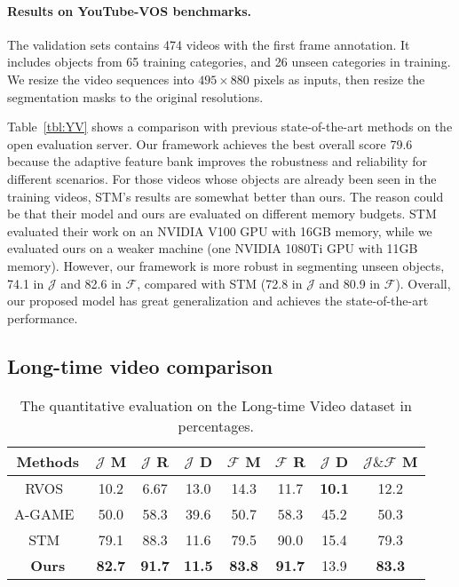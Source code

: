 \documentclass{article}
\begin{document}
\paragraph{Results on YouTube-VOS benchmarks.}
The validation sets contains 474 videos with the first frame annotation. 
It includes objects from 65 training categories, and 26 unseen categories in training. 
We resize the video sequences into $495 \times 880$ pixels as inputs, then resize the segmentation masks to the original resolutions.

Table~\ref{tbl:YV} shows a comparison with previous state-of-the-art methods on the open evaluation server.
Our framework achieves the best overall score 79.6 because the adaptive feature bank improves the robustness and reliability for different scenarios.
For those videos whose objects are already been seen in the training videos, STM's results are somewhat better than ours.
The reason could be that their model and ours are evaluated on different memory budgets.
STM~\cite{oh_video_2019} evaluated their work on an NVIDIA V100 GPU with 16GB memory, while we evaluated ours on a weaker machine (one NVIDIA 1080Ti GPU with 11GB memory).
However, our framework is more robust in segmenting unseen objects, 74.1 in $\mathcal{J}$ and 82.6 in $\mathcal{F}$, compared with STM (72.8 in $\mathcal{J}$ and 80.9 in $\mathcal{F}$).
Overall, our proposed model has great generalization and achieves the state-of-the-art performance.
  
\subsection{Long-time video comparison}
\begin{table}[h]
  \caption{The quantitative evaluation on the Long-time Video dataset in percentages.}
  \label{tbl:longvideo}
  \centering
  \begin{tabular}{c|cccccc|c}
        \toprule
        Methods & $\mathcal{J}$ M & $\mathcal{J}$ R & $\mathcal{J}$ D & $\mathcal{F}$ M & $\mathcal{F}$ R & $\mathcal{J}$ D & $\mathcal{J} \& \mathcal{F}$ M\\
        \midrule
        RVOS~\cite{ventura2019rvos}   & 10.2 & 6.67 & 13.0 & 14.3 & 11.7 & \textbf{10.1} & 12.2 \\
        A-GAME~\cite{johnander2019generative} & 50.0 & 58.3 & 39.6 & 50.7 & 58.3 & 45.2 & 50.3 \\
        STM~\cite{oh_video_2019}  & 79.1 & 88.3 & 11.6 & 79.5 & 90.0 & 15.4 & 79.3 \\
        \textbf{Ours}  & \textbf{82.7} & \textbf{91.7} & \textbf{11.5} & \textbf{83.8} & \textbf{91.7} & 13.9 & \textbf{83.3} \\
        \bottomrule
    \end{tabular}
\end{table}
\end{document}
